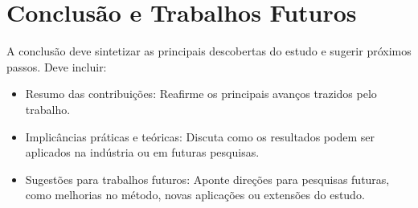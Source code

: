 \section{ Conclusão e Trabalhos Futuros}

A conclusão deve sintetizar as principais descobertas do estudo e sugerir próximos passos. Deve incluir:

\begin{itemize}
    \item Resumo das contribuições: Reafirme os principais avanços trazidos pelo trabalho.

    \item Implicâncias práticas e teóricas: Discuta como os resultados podem ser aplicados na indústria ou em futuras pesquisas.

    \item Sugestões para trabalhos futuros: Aponte direções para pesquisas futuras, como melhorias no método, novas aplicações ou extensões do estudo.

\end{itemize}

